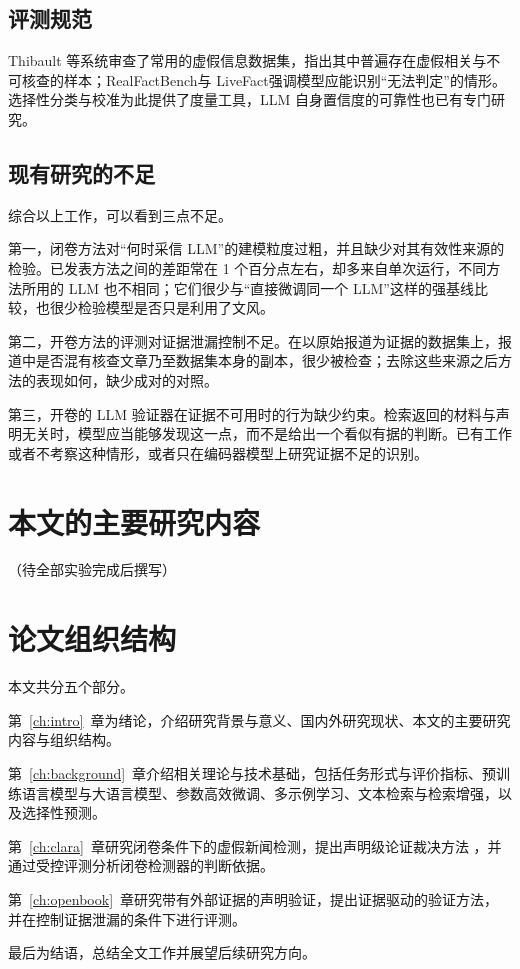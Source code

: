 \subsection{评测规范}

Thibault 等\citep{thibault2025guide}系统审查了常用的虚假信息数据集，指出其中普遍存在虚假相关与不可核查的样本；RealFactBench\citep{yang2025realfactbench}与 LiveFact\citep{xu2026livefact}强调模型应能识别“无法判定”的情形。选择性分类\citep{geifman2017selective,geifman2019bias}与校准\citep{guo2017calibration}为此提供了度量工具，LLM 自身置信度的可靠性也已有专门研究\citep{xiong2024can,tian2023just}。

\subsection{现有研究的不足}

综合以上工作，可以看到三点不足。

第一，闭卷方法对“何时采信 LLM”的建模粒度过粗，并且缺少对其有效性来源的检验。已发表方法之间的差距常在 1 个百分点左右，却多来自单次运行，不同方法所用的 LLM 也不相同；它们很少与“直接微调同一个 LLM”这样的强基线比较，也很少检验模型是否只是利用了文风。

第二，开卷方法的评测对证据泄漏控制不足。在以原始报道为证据的数据集上，报道中是否混有核查文章乃至数据集本身的副本，很少被检查；去除这些来源之后方法的表现如何，缺少成对的对照。

第三，开卷的 LLM 验证器在证据不可用时的行为缺少约束。检索返回的材料与声明无关时，模型应当能够发现这一点，而不是给出一个看似有据的判断。已有工作或者不考察这种情形，或者只在编码器模型上研究证据不足的识别。

\section{本文的主要研究内容}\label{sec:intro-contrib}

（待全部实验完成后撰写）

\section{论文组织结构}\label{sec:intro-org}

本文共分五个部分。

第~\ref{ch:intro}~章为绪论，介绍研究背景与意义、国内外研究现状、本文的主要研究内容与组织结构。

第~\ref{ch:background}~章介绍相关理论与技术基础，包括任务形式与评价指标、预训练语言模型与大语言模型、参数高效微调、多示例学习、文本检索与检索增强，以及选择性预测。

第~\ref{ch:clara}~章研究闭卷条件下的虚假新闻检测，提出声明级论证裁决方法 \method{}，并通过受控评测分析闭卷检测器的判断依据。

第~\ref{ch:openbook}~章研究带有外部证据的声明验证，提出证据驱动的验证方法，并在控制证据泄漏的条件下进行评测。

最后为结语，总结全文工作并展望后续研究方向。
